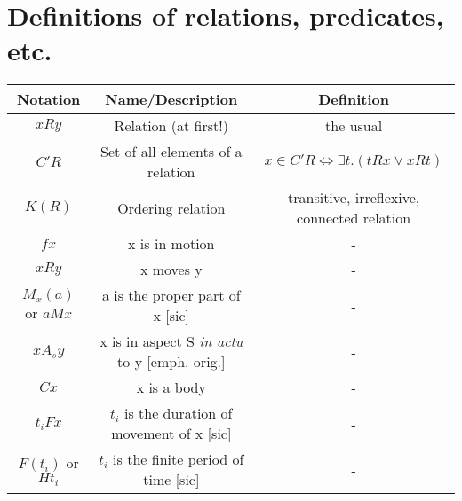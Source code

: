 \documentclass[english,paper=a4,]{scrartcl}%
\begin{document}
\section{Definitions of relations, predicates, etc.}
\begin{tabular}{|c|c|c|}
\hline 
\textbf{Notation} & \textbf{Name/Description} & \textbf{Definition} \\ 
\hline 
$x R y$ & Relation (at first!) & the usual \\ 
\hline 
$C'R$& Set of all elements of a relation & $x \in C'R \Leftrightarrow \exists t. (t R x \vee x R t)$ \\ 
\hline 
$K(R)$ & Ordering relation & transitive, irreflexive, connected relation \\ 
\hline 
$f x$ & x is in motion &  - \\ 
\hline 
$x R y$ & x moves y&  - \\ 
\hline 
$M_{x}(a)$ or $a M x$ & a is the proper part of x [sic] & -  \\ 
\hline
$xA_{s}y$ & x is in aspect S \emph{in actu} to y [emph. orig.] & -  \\ 
\hline 
$C x$ & x is a body & -  \\ 
\hline 
 $t_{i}Fx$  & $t_i$ is the duration of movement of x [sic] & -  \\ 
\hline 
 $F(t_i)$ or $Ht_i$ & $t_i$ is the finite period of time [sic]& -  \\ 
\hline 
\end{tabular}
%
\end{document}
